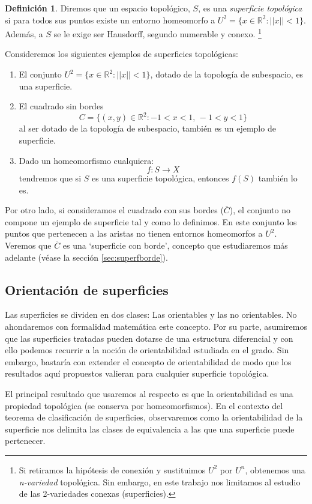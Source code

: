 \documentclass[a4paper,11pt,spanish, twoside, leqno]{tfg-uam}
\theoremstyle{definition}
\newtheorem{defin}[teor]{Definici\'on}
\begin{document}
\begin{defin}
\label{defin:superficie}
Diremos que un espacio topológico, $S$, es una \textit{superficie topológica} si para todos sus puntos existe un entorno homeomorfo a $U^2 = \{x\in \mathbb{R}^2: ||x||<1 \}$. Además, a $S$ se le exige ser Hausdorff, segundo numerable y conexo. \footnote{Si retiramos la hipótesis de conexión y sustituimos $U^2$ por $U^n$, obtenemos una \textit{n-variedad} topológica. Sin embargo, en este trabajo nos limitamos al estudio de las 2-variedades conexas (superficies).}
\end{defin}
Consideremos los siguientes ejemplos de superficies topológicas:
\begin{enumerate}
\item El conjunto $ U^2 = \{ x\in\mathbb{R}^2: ||x||<1 \} $, dotado de la topología de subespacio, es una superficie. 

\item El cuadrado sin bordes
\[ C = \{(x,y)\in \mathbb{R}^2: -1 <  x < 1,\, -1 < y < 1 \} \]
al ser dotado de la topología de subespacio, también es un ejemplo de superficie.

\item Dado un homeomorfismo cualquiera:
\[ f:S \rightarrow X \]
tendremos que si $S$ es una superficie topológica, entonces $f(S)$ también lo es.
\end{enumerate}

Por otro lado, si consideramos el cuadrado con sus bordes ($\overline{C}$), el conjunto no compone un ejemplo de superficie tal y como lo definimos. En este conjunto los puntos que pertenecen a las aristas no tienen entornos homeomorfos a $U^2$. Veremos que $\overline{C}$ es una `superficie con borde', concepto que estudiaremos más adelante (véase la sección \ref{sec:superfborde}).
\subsection{Orientación de superficies}
\label{sec:orientabilidad}
Las superficies se dividen en dos clases: Las orientables y las no orientables. No ahondaremos con formalidad matemática este concepto. Por su parte, asumiremos que las superficies tratadas pueden dotarse de una estructura diferencial y con ello podemos recurrir a la noción de orientabilidad estudiada en el grado. Sin embargo, bastaría con extender el concepto de orientabilidad de modo que los resultados aquí propuestos valieran para cualquier superficie topológica.

El principal resultado que usaremos al respecto es que la orientabilidad es una propiedad topológica (se conserva por homeomorfismos). En el contexto del teorema de clasificación de superficies, observaremos como la orientabilidad de la superficie nos delimita las clases de equivalencia a las que una superficie puede pertenecer.
\end{document}

